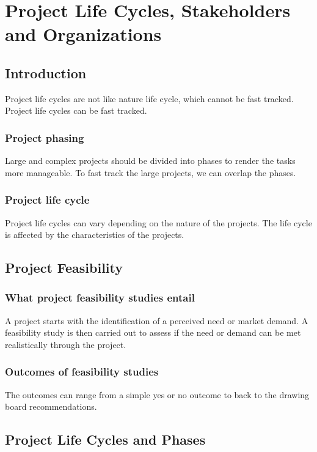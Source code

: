\documentclass[math,code]{amznotes}
\theoremstyle{remark}
\begin{document}
\chapter{Project Life Cycles, Stakeholders and Organizations}
\section{Introduction}
Project life cycles are not like nature life cycle, which cannot be fast tracked. Project life cycles can be fast tracked.

\subsection{Project phasing}
Large and complex projects should be divided into phases to render the tasks more manageable. To fast track the large projects, we can overlap the phases.

\subsection{Project life cycle}
Project life cycles can vary depending on the nature of the projects. The life cycle is affected by the characteristics of the projects.

\section{Project Feasibility}
\subsection{What project feasibility studies entail}
A project starts with the identification of a perceived need or market demand. A feasibility study is then carried out to assess if the need or demand can be met realistically through the project.

\subsection{Outcomes of feasibility studies}
The outcomes can range from a simple yes or no outcome to back to the drawing board recommendations.

\section{Project Life Cycles and Phases}
\end{document}
